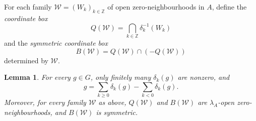 \documentclass[preprint,3p]{elsarticle}
\theoremstyle{plain}
\newtheorem{lem}[thm]{Lemma}
\theoremstyle{definition}
\numberwithin{equation}{section}
\begin{document}
For each family $\mathcal W=(W_k)_{k\in\mathbb Z}$ of open
zero-neighbourhoods in $A$, define the \emph{coordinate box}
\begin{equation}
\label{eq-coordinate-box-Q}
 Q(\mathcal W)=\bigcap_{k \in \mathbb Z } \delta_k^{-1}(W_k)
\end{equation}
and the \emph{symmetric coordinate box}
\begin{equation}
\label{eq-coordinate-box-B}
 B(\mathcal W)=Q(\mathcal W)\cap(-Q(\mathcal W))
\end{equation}
determined by $\mathcal W$.

\begin{lem}
\label{lem-deviation-decomposition}
For every $g\in G$, only finitely many $\delta_k(g)$ are nonzero, and
\begin{equation}
\label{eq-deviation-decomposition}
 g=\sum_{k\geq0}\delta_k(g)-\sum_{k<0}\delta_k(g).
\end{equation}
Moreover, for every family $\mathcal W$ as above,
$Q(\mathcal W)$ and $B(\mathcal W)$ are $\lambda_A$-open
zero-neighbourhoods, and $B(\mathcal W)$ is symmetric.
\end{lem}
\end{document}
